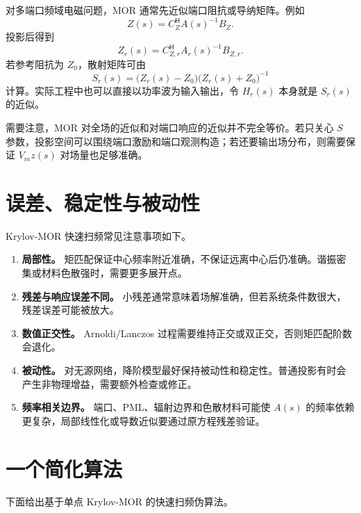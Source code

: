 \documentclass[UTF8,a4paper,11pt]{ctexart}
\newcommand{\herm}{\mathsf{H}}
\begin{document}
对多端口频域电磁问题，MOR 通常先近似端口阻抗或导纳矩阵。例如
\[
    Z(s)=C_Z^{\herm}A(s)^{-1}B_Z .
\]
投影后得到
\[
    Z_r(s)=C_{Z,r}^{\herm}A_r(s)^{-1}B_{Z,r}.
\]
若参考阻抗为 $Z_0$，散射矩阵可由
\begin{equation}
    S_r(s)=\bigl(Z_r(s)-Z_0\bigr)\bigl(Z_r(s)+Z_0\bigr)^{-1}
    \label{eq:sparam}
\end{equation}
计算。实际工程中也可以直接以功率波为输入输出，令 $H_r(s)$ 本身就是 $S_r(s)$ 的近似。

需要注意，MOR 对全场的近似和对端口响应的近似并不完全等价。若只关心 $S$ 参数，投影空间可以围绕端口激励和端口观测构造；若还要输出场分布，则需要保证 $V_mz(s)$ 对场量也足够准确。

\section{误差、稳定性与被动性}

Krylov-MOR 快速扫频常见注意事项如下。

\begin{enumerate}
    \item \textbf{局部性。} 矩匹配保证中心频率附近准确，不保证远离中心后仍准确。谐振密集或材料色散强时，需要更多展开点。
    \item \textbf{残差与响应误差不同。} 小残差通常意味着场解准确，但若系统条件数很大，残差误差可能被放大。
    \item \textbf{数值正交性。} Arnoldi/Lanczos 过程需要维持正交或双正交，否则矩匹配阶数会退化。
    \item \textbf{被动性。} 对无源网络，降阶模型最好保持被动性和稳定性。普通投影有时会产生非物理增益，需要额外检查或修正。
    \item \textbf{频率相关边界。} 端口、PML、辐射边界和色散材料可能使 $A(s)$ 的频率依赖更复杂，局部线性化或导数近似要通过原方程残差验证。
\end{enumerate}

\section{一个简化算法}

下面给出基于单点 Krylov-MOR 的快速扫频伪算法。
\end{document}
